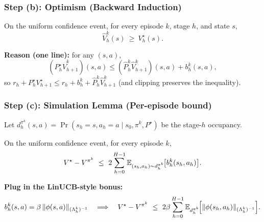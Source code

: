 \documentclass[aspectratio=169]{beamer}
\begin{document}
\begin{frame}\frametitle{Step (b): Optimism (Backward Induction)}

\small
On the uniform confidence event, for every episode $k$, stage $h$, and state $s$,
\[
\widehat V_h^k(s)\ \ge\ V_h^\star(s).
\]

\vspace{0.12cm}
\pause
\textbf{Reason (one line):}
for any $(s,a)$,
\[
(P_h^\star \widehat V_{h+1}^k)(s,a)
\le
(\widehat P_h^k \widehat V_{h+1}^k)(s,a)+b_h^k(s,a),
\]
so $r_h + P_h^\star V_{h+1}^\star \le r_h + b_h^k + \widehat P_h^k\widehat V_{h+1}^k$ (and clipping preserves the inequality).

\end{frame}


\begin{frame}\frametitle{Step (c): Simulation Lemma (Per-episode bound)}

\small
Let $d_h^{\pi^k}(s,a)=\Pr(s_h=s,a_h=a\mid s_0,\pi^k,P^\star)$ be the stage-$h$ occupancy.

\vspace{0.10cm}
On the uniform confidence event, for every episode $k$,
\[
V^\star - V^{\pi^k}
\ \le\
2\sum_{h=0}^{H-1}\mathbb{E}_{(s_h,a_h)\sim d_h^{\pi^k}}\!\big[b_h^k(s_h,a_h)\big].
\]

\vspace{0.12cm}
\pause
\textbf{Plug in the LinUCB-style bonus:}
\[
b_h^k(s,a)=\beta\,\|\phi(s,a)\|_{(\Lambda_h^k)^{-1}}
\quad\Longrightarrow\quad
V^\star - V^{\pi^k}
\ \le\
2\beta\sum_{h=0}^{H-1}\mathbb{E}_{d_h^{\pi^k}}\!\Big[\|\phi(s_h,a_h)\|_{(\Lambda_h^k)^{-1}}\Big].
\]

\end{frame}
\end{document}

